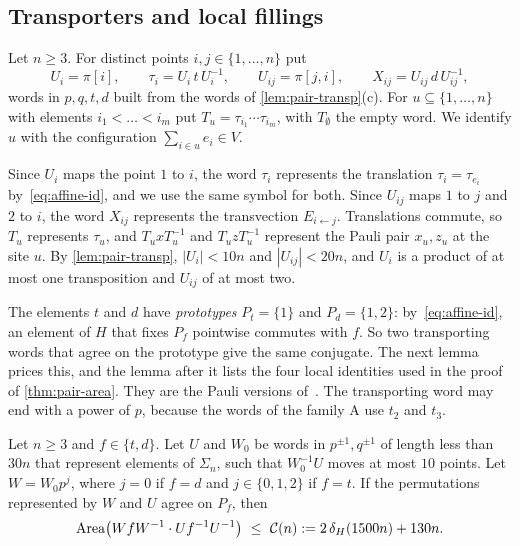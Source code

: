 \subsection{Transporters and local fillings}\label{sec:pair-local}

\begin{definition}[Transporters]\label{def:transporter}
Let $n\ge3$. For distinct points $i,j\in\{1,\dots,n\}$ put
\[
U_i=\pi[i],\qquad \tau_i=U_i\,t\,U_i^{-1},\qquad U_{ij}=\pi[j,i],\qquad X_{ij}=U_{ij}\,d\,U_{ij}^{-1},
\]
words in $p,q,t,d$ built from the words of \cref{lem:pair-transp}(c). For $u\subseteq\{1,\dots,n\}$ with elements $i_1<\dots<i_m$ put
$T_u=\tau_{i_1}\cdots\tau_{i_m}$, with $T_\emptyset$ the empty word. We identify $u$ with the configuration $\sum_{i\in u}e_i\in V$.
\end{definition}

Since $U_i$ maps the point $1$ to $i$, the word $\tau_i$ represents the translation $\tau_i=\tau_{e_i}$ by~\eqref{eq:affine-id}, and we use
the same symbol for both. Since $U_{ij}$ maps $1$ to $j$ and $2$ to $i$, the word $X_{ij}$ represents the transvection $E_{i\leftarrow j}$.
Translations commute, so $T_u$ represents $\tau_u$, and $T_uxT_u^{-1}$ and $T_uzT_u^{-1}$ represent the Pauli pair $x_u,z_u$ at the site
$u$. By \cref{lem:pair-transp}, $|U_i|<10n$ and $|U_{ij}|<20n$, and $U_i$ is a product of at most one transposition and $U_{ij}$ of at most
two.

The elements $t$ and $d$ have \emph{prototypes} $P_t=\{1\}$ and $P_d=\{1,2\}$: by~\eqref{eq:affine-id}, an element of $H$ that fixes $P_f$
pointwise commutes with $f$. So two transporting words that agree on the prototype give the same conjugate. The next lemma prices this,
and the lemma after it lists the four local identities used in the proof of \cref{thm:pair-area}. They are the Pauli versions
of~\cite[Lemmas~4.1 and~4.2]{DM-lamps}. The transporting word may end with a power of $p$, because the words of the family \textsf{A}
use $t_2$ and $t_3$.

\begin{lemma}\label{lem:exchange}
Let $n\ge3$ and $f\in\{t,d\}$. Let $U$ and $W_0$ be words in $p^{\pm1},q^{\pm1}$ of length less than $30n$ that represent elements of
$\Sigma_n$, such that $W_0^{-1}U$ moves at most $10$ points. Let $W=W_0p^j$, where $j=0$ if $f=d$ and $j\in\{0,1,2\}$ if $f=t$. If the
permutations represented by $W$ and $U$ agree on $P_f$, then
\[
\operatorname{Area}\bigl(WfW^{-1}\cdot Uf^{-1}U^{-1}\bigr)\ \le\ \mathcal C(n):=2\,\delta_{H}(1500n)+130n .
\]
\end{lemma}

